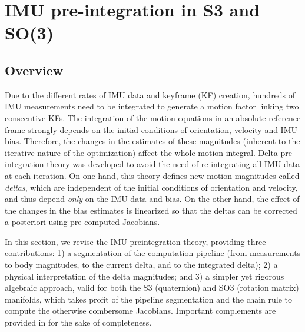 

\newcommand{\bw}{{\bfomega}}
\newcommand{\bth}{{\bftheta}}
\newcommand{\bphi}{{\bfphi}}
\newcommand{\nth}{\norm{\bth}}
\newcommand{\ab}{{\bfa_b}}
\newcommand{\wb}{{\bw_b}}
\newcommand{\D}{\Delta}
\newcommand{\Dzero}{{\D^0}}
\newcommand{\Dp}{{\D\bfp}}
\newcommand{\Dv}{{\D\bfv}}
\newcommand{\Dth}{{\D\bth}}
\newcommand{\Dq}{{\D\bfq}}
\newcommand{\DR}{{\D\bfR}}
\newcommand{\DP}{{\D\bfP}}
\newcommand{\DV}{{\D\bfV}}
\newcommand{\DTH}{{\D\bfTheta}}
\newcommand{\Dw}{{\D\bw}}
\newcommand{\DW}{{\D\bfOmega}}
\newcommand{\dpp}{{\delta\bfp}}
\newcommand{\dv}{{\delta\bfv}}
\newcommand{\dth}{{\delta\bth}}
\newcommand{\dq}{{\delta\bfq}}
\newcommand{\dR}{{\delta\bfR}}
\newcommand{\dP}{{\delta\bfP}}
\newcommand{\dV}{{\delta\bfV}}
\newcommand{\dTH}{{\delta\bfTheta}}
\newcommand{\dw}{{\delta\bw}}

\newcommand{\te}{\triangleq}
\newcommand{\od}{\odot}


\section{IMU pre-integration in S3 and SO(3)}

\subsection{Overview}

Due to the different rates of IMU data and keyframe (KF) creation, hundreds of IMU measurements need to be integrated to generate a motion factor linking two consecutive KFs. 
The integration of the motion equations in an absolute reference frame strongly depends on the initial conditions of orientation, velocity and IMU bias.
Therefore, the changes in the estimates of these magnitudes (inherent to the iterative nature of the optimization) affect the whole motion integral. 
Delta pre-integration theory was developed \cite{LUPTON-09,forster2015imu} to avoid the need of re-integrating all IMU data at each iteration. 
On one hand, this theory defines new motion magnitudes called \emph{deltas}, which are independent of the initial conditions of orientation and velocity, and thus depend \emph{only} on the IMU data and bias. 
On the other hand, the effect of the changes in the bias estimates is linearized so that the deltas can be corrected a posteriori using pre-computed Jacobians. 

In this section, we revise the IMU-preintegration theory, providing three contributions: 
1) a segmentation of the computation pipeline (from measurements to body magnitudes, to the current delta, and to the integrated delta); 
2) a physical interpretation of the delta magnitudes; 
and 
3) a simpler yet rigorous algebraic approach, valid for both the S3 (quaternion) and SO3 (rotation matrix) manifolds, which takes profit of the pipeline segmentation and the chain rule to compute the otherwise combersome \cite{forster2015imu} Jacobians. 
Important complements are provided in  for the sake of completeness.

